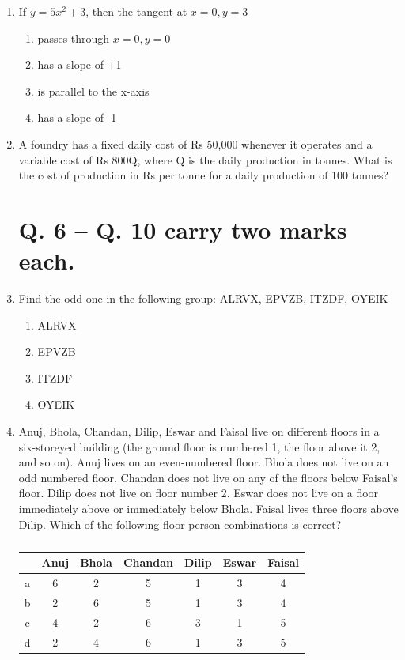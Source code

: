 \documentclass[journal,12pt,onecolumn]{IEEEtran}
\theoremstyle{remark}
\begin{document}
\begin{enumerate}
\item If $y=5x^2+3$, then the tangent at $x=0,y=3$

\hfill{}
\begin{enumerate}
\item passes through $x = 0, y = 0$
\item has a slope of +1
\item is parallel to the x-axis
\item has a slope of -1
\end{enumerate}

\item A foundry has a fixed daily cost of Rs 50,000 whenever it operates and a variable cost of Rs 800Q, where Q is the daily production in tonnes. What is the cost of production in Rs per tonne for a daily production of 100 tonnes?

\hfill{}

\section*{Q. 6 – Q. 10 carry two marks each.}

\item Find the odd one in the following group: ALRVX, EPVZB, ITZDF, OYEIK

\hfill{}
\begin{enumerate}
\item ALRVX
\item EPVZB
\item ITZDF
\item OYEIK
\end{enumerate}

\item Anuj, Bhola, Chandan, Dilip, Eswar and Faisal live on different floors in a six-storeyed building (the ground floor is numbered 1, the floor above it 2, and so on). Anuj lives on an even-numbered floor. Bhola does not live on an odd numbered floor. Chandan does not live on any of the floors below Faisal’s floor. Dilip does not live on floor number 2. Eswar does not live on a floor immediately above or immediately below Bhola. Faisal lives three floors above Dilip. Which of the following floor-person combinations is correct?

\hfill{}
\begin{table}[H]
\centering
\begin{tabular}{|c|c|c|c|c|c|c|}
\hline
  & Anuj & Bhola & Chandan & Dilip & Eswar & Faisal \\
\hline
a & 6 & 2 & 5 & 1 & 3 & 4 \\
\hline
b & 2 & 6 & 5 & 1 & 3 & 4 \\
\hline
c & 4 & 2 & 6 & 3 & 1 & 5 \\
\hline
d & 2 & 4 & 6 & 1 & 3 & 5 \\
\hline
\end{tabular}
\caption*{}
\label{tab:Q.7}
\end{table}


\end{enumerate}
\end{document}
